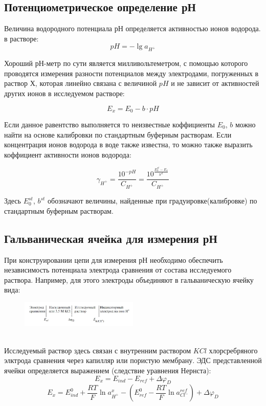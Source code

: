 \documentclass[a4paper,12pt]{article}
\begin{document}
\subsection{Потенциометрическое определение рН}
Величина водородного потенциала рН определяется активностью ионов водорода.
в растворе:
\[
pH = -\lg a_{H^{+}}
\]

Хороший рН-метр по сути является милливольтеметром, с помощью которого проводятся измерения разности потенциалов между электродами, погруженных в раствор Х, которая линейно связана с величиной $pH$ и не зависит от активностей других ионов в исследуемом растворе:

\begin{equation}
    E_{x} = E_{0} - b\cdot pH
\end{equation}


Если данное равентство выполняется то неизвестные коффициенты $E_{0}$, $b$ можно найти на основе калибровки по стандартным буферным растворам. Если концентрация ионов водорода в воде также известна, то можно также выразить коффициент активности ионов водорода:

\[
\gamma_{H^{+}} = \frac{10^{-pH}}{C_{H^{+}}} = \frac{10^{\frac{E_{0}^{st} - E_{x}}{b^{st}}}}{C_{H^{+}}}
\]

Здесь $E_{0}^{st}$, $b^{st}$ обозначают величины, найденные при градуировке(калибровке) по стандартным буферным растворам.

\subsection{ Гальваническая ячейка для измерения рН}

При конструировании цепи для измерения рН необходимо обеспечить независимость потенциала электрода сравнения от состава исследуемого раствора. Например, для этого электроды объединяют в гальваническую ячейку вида:

\begin{figure}[h!]
    \centering
    \includegraphics[width = 0.5\textwidth]{1.png}
\end{figure}\\

Исследуемый раствор здесь связан с внутренним раствором $KCl$ хлорсребряного элктрода сравнения через капилляр или пористую мембрану. ЭДС представленной ячейки определяется выражением (следствие уравнения Нернста):
\[
E_{x} = E_{ind} - E_{ref} + \Delta \varphi_{D}
\]
\[
E_{x} = E_{ind}^{0} + \frac{RT}{F}\ln a^{x}_{H^{+}} - (E_{ref}^{0} - \frac{RT}{F}\ln a^{ref}_{Cl^{-}}) + \Delta \varphi_{D}
\]
\end{document}
